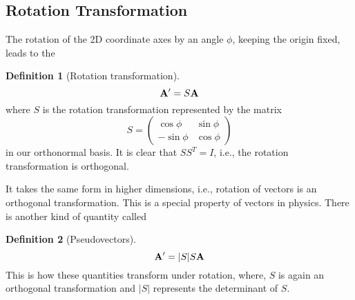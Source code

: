\documentclass[10pt, a4paper]{extarticle}
\theoremstyle{definition}
\newtheorem{defn}{Definition}
\numberwithin{equation}{subsection}
\begin{document}
\subsection{Rotation Transformation}
The rotation of the 2D coordinate axes by an angle $\phi$, keeping the origin fixed, leads to the
\begin{framed}
	\begin{defn}[Rotation transformation]
		\begin{equation}\vb{A'}=S\vb{A}\end{equation}
		where $S$ is the rotation transformation represented by the matrix
		\begin{equation}S=\left(\begin{matrix}
				\cos\phi  & \sin\phi \\
				-\sin\phi & \cos\phi
			\end{matrix}\right)\end{equation} in our orthonormal basis.
		It is clear that $SS^T=I$, i.e., the rotation transformation is orthogonal.
	\end{defn}
\end{framed}
It takes the same form in higher dimensions, i.e., rotation of vectors is an orthogonal transformation. This is a special property of vectors in physics. There is another kind of quantity called
\begin{framed}
	\begin{defn}[Pseudovectors]
		\begin{equation}\vb{A'}=|S|S\vb{A}\end{equation}
		This is how these quantities transform under rotation, where, $S$ is again an orthogonal transformation and $|S|$ represents the determinant of $S$.
	\end{defn}
\end{framed}
\end{document}
